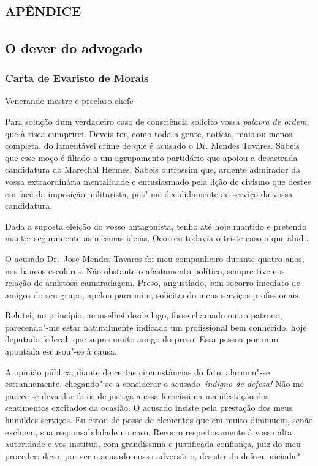\part{\textsc{apêndice}}

\chapter{O dever do advogado}

\section{Carta de Evaristo de Morais}
\bigskip

\begingroup
\linenumbers

\noindent Venerando mestre e preclaro chefe
\bigskip

Para solução dum verdadeiro caso de
consciência solicito vossa \textit{palavra de ordem}, que à risca
cumprirei. Deveis ter, como toda a gente, notícia, mais ou menos
completa, do lamentável crime de que é acusado o Dr. Mendes Tavares.
Sabeis que esse moço é filiado a um agrupamento partidário que apoiou a
desastrada candidatura do Marechal Hermes. Sabeis outrossim que,
ardente admirador da vossa extraordinária mentalidade e entusiasmado
pela lição de civismo que destes em face da imposição militarista,
pus"-me decididamente ao serviço da vossa candidatura. 

Dada a suposta eleição do vosso antagonista, tenho até hoje mantido e pretendo manter
seguramente as mesmas ideias. Ocorreu todavia o triste caso a que aludi. 

O acusado Dr.~José Mendes Tavares foi meu companheiro durante
quatro anos, nos bancos escolares. Não obstante o afastamento
político, sempre tivemos relação de amistosa camaradagem. Preso,
angustiado, sem socorro imediato de amigos do seu grupo, apelou para
mim, solicitando meus serviços profissionais. 

Relutei, no princípio;
aconselhei desde logo, fosse chamado outro patrono, parecendo"-me
estar naturalmente indicado um profissional bem conhecido, hoje
deputado federal, que supus muito amigo do preso. Essa pessoa por mim
apontada escusou"-se à causa. 

A opinião pública, diante de certas
circunstâncias do fato, alarmou"-se estranhamente, chegando"-se a
considerar o acusado \textit{indigno de defesa!} Não me
parece se deva dar foros de justiça a essa ferocíssima manifestação dos
sentimentos excitados da ocasião. O acusado insiste pela prestação dos
meus humildes serviços. Eu estou de posse de elementos que em muito
diminuem, senão excluem, sua responsabilidade no caso. Recorro
respeitosamente à vossa alta autoridade e vos instituo, com
grandíssima e justificada confiança, juiz do meu proceder: devo, por
ser o acusado nosso adversário, desistir da defesa iniciada?

